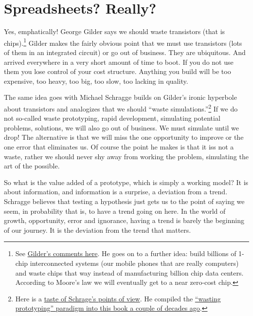\documentclass[
]{book}
\begin{document}
\hypertarget{spreadsheets-really}{%
\section{Spreadsheets? Really?}\label{spreadsheets-really}}

Yes, emphatically! George Gilder says we should waste transistors (that is chips).\footnote{See \href{https://gilderpress.com/2020/03/12/investors-should-ignore-materialistic-superstitions/}{Gilder's comments here}. He goes on to a further idea: build billions of 1-chip interconnected systems (our mobile phones that are really computers) and waste chips that way instead of manufacturing billion chip data centers. According to Moore's law we will eventually get to a near zero-cost chip.} Gilder makes the fairly obvious point that we must use transistors (lots of them in an integrated circuit) or go out of business. They are ubiquitous. And arrived everywhere in a very short amount of time to boot. If you do not use them you lose control of your cost structure. Anything you build will be too expensive, too heavy, too big, too slow, too lacking in quality.

The same idea goes with Michael Schragge builds on Gilder's ironic hyperbole about transistors and analogizes that we should ``waste simulations.''\footnote{Here is a \href{https://www.technologyreview.com/2004/07/01/40161/prepared-minds-favor-chance/}{taste of Schrage's points of view}. He compiled the \href{https://www.amazon.com/exec/obidos/ASIN/0875848141/softwgardeinc}{``wasting prototyping'' paradigm into this book a couple of decades ago}.} If we do not so-called waste prototyping, rapid development, simulating potential problems, solutions, we will also go out of business. We must simulate until we drop! The alternative is that we will miss the one opportunity to improve or the one error that eliminates us. Of course the point he makes is that it iss not a waste, rather we should never shy away from working the problem, simulating the art of the possible.

So what is the value added of a prototype, which is simply a working model? It is about information, and information is a surprise, a deviation from a trend. Schragge believes that testing a hypothesis just gets us to the point of saying we seem, in probability that is, to have a trend going on here. In the world of growth, opportunity, error and ignorance, having a trend is barely the beginning of our journey. It is the deviation from the trend that matters.
\end{document}
